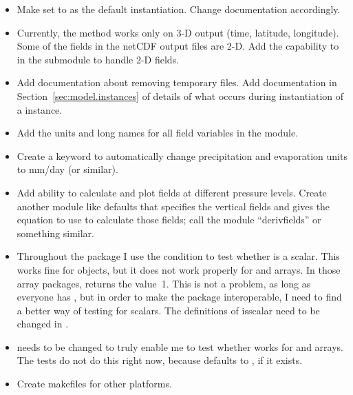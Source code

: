 \begin{itemize}
\item Make  set to  as the
	default instantiation.  Change documentation accordingly.

\item Currently, the   method works only on
	3-D output (time, latitude, longitude).  Some of the fields
	in the netCDF output files are 2-D.  Add the capability to
	 in the  submodule
	to handle 2-D fields.

\item Add documentation about removing temporary files.
	Add documentation in Section~\ref{sec:model.instances}
	of details of what occurs during instantiation of 
	a  instance.

\item Add the units and long names for all field variables in the
	 module.

\item Create a keyword to automatically change precipitation and
	evaporation units to mm/day (or similar).

\item Add ability to calculate and plot fields at different pressure
	levels.  Create another module like defaults that specifies
	the vertical fields and gives the equation to use to calculate
	those fields; call the module ``derivfields'' or something
	similar.

\item Throughout the  package I use the condition
	to test whether
	 is a scalar.  This works fine for 
	objects, but it does not work properly for
	 and  arrays.  In those
	array packages,  returns the value~1.
	This is not a problem, as long as everyone has ,
	but in order to make the package interoperable, I need to
	find a better way of testing for scalars.  The definitions
	of isscalar need to be changed in .

\item {} needs to be changed to truly enable me
	to test whether  works for 
	 and  arrays.  The tests
	do not do this right now, because 
	defaults to , if it exists.

\item Create makefiles for other platforms.
 

\end{itemize}
